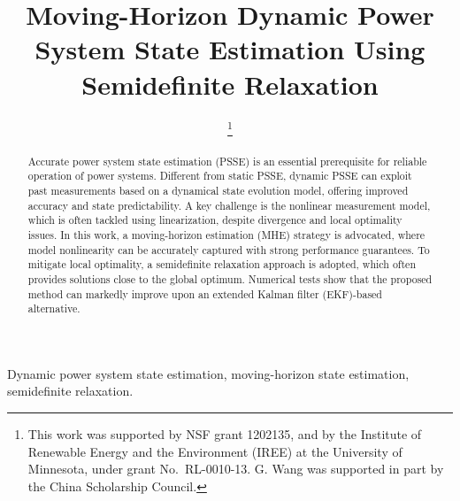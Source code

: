 \documentclass[conference]{IEEEtran}
\begin{document}
\title{Moving-Horizon Dynamic Power System State Estimation Using Semidefinite Relaxation}


\author{
\thanks{This work was supported by NSF grant 1202135, and by the Institute of Renewable Energy and the Environment (IREE) at the University of Minnesota, under grant No.~RL-0010-13. G. Wang was supported in part by the China Scholarship Council.}}


\maketitle

\begin{abstract}
Accurate power system state estimation (PSSE) is an essential prerequisite for reliable operation of power systems. Different from static PSSE, dynamic PSSE can exploit past measurements based on a dynamical state evolution model, offering improved accuracy and state predictability. A key challenge is the nonlinear measurement model, which is often tackled using linearization, despite divergence and local optimality issues. In this work, a moving-horizon estimation (MHE) strategy is advocated, where model nonlinearity can be accurately captured with strong performance guarantees. To mitigate local optimality, a semidefinite relaxation approach is adopted, which often provides solutions close to the global optimum. Numerical tests show that the proposed method can markedly improve upon an extended Kalman filter (EKF)-based alternative.

\end{abstract}

\begin{IEEEkeywords}
Dynamic power system state estimation, moving-horizon state estimation, semidefinite relaxation.
\end{IEEEkeywords}
\end{document}
